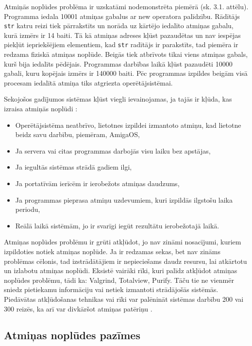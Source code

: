 Atmiņās noplūdes problēma ir uzskatāmi nodemonstrēta piemērā (sk. 3.1. attēlu).
Programma  iedala 10001 atmiņas gabalus ar new operatora palīdzību. 
Rādītājs \texttt{str} katru reizi tiek pārrakstīts un norāda uz kārtējo iedalīto atmiņas gabalu, kurā izmērs ir 14 baiti.
Tā kā atmiņas adreses kļūst pazaudētas un nav iespējas piekļūt iepriekšējiem elementiem, kad  \texttt{str} radītājs ir parakstīts, tad piemēra ir redzama fiziskā atmiņas noplūde.
Beigās tiek atbrīvots tikai viens atmiņas gabals, kurš bija iedalīts pēdējais. 
Programmas darbības laikā kļūst pazaudēti 10000 gabali, kuru kopējais izmērs ir 140000 baiti.
 Pēc programmas izpildes beigām visā procesam iedalītā atmiņa tiks atgriezta operētājsistēmai.


Sekojošos gadījumos sistēmas kļūst viegli ievainojamas, ja tajās ir kļūda, kas izraisa atmiņās noplūdi \cite{RTTV}: 
\begin{itemize}
\item { Operētājsistēma neatbrīvo, lietotnes izpildei izmantoto atmiņu, kad lietotne beidz savu darbību, piemēram, AmigaOS,}
\item { Ja servera vai citas programmas darbojās visu laiku bez apstājas, }
\item { Ja iegultās sistēmas strādā gadiem ilgi, }
\item { Ja portatīvām ierīcēm ir ierobežots atmiņas daudzums, }
\item { Ja programmas pieprasa atmiņu uzdevumiem, kuri izpildās ilgstošu laika periodu, }
\item { Reālā laikā sistēmām, jo ir svarīgi iegūt rezultātu ierobežotajā laikā. }
\end{itemize}

Atmiņas noplūdes problēmu ir grūti atkļūdot,  jo nav zināmi nosacījumi, kuriem izpildoties notiek atmiņas noplūde. 
Ja ir redzamas sekas, bet nav zināms problēmas cēlonis, tad izstrādātājiem ir nepieciešams daudz resursu, lai atkārtotu un izlabotu atmiņas noplūdi. 
Eksistē vairāki rīki, kuri palīdz atkļūdot atmiņas noplūdes problēmu, tādi ka: Valgrind, Totalview, Purify. 
Tāču tie ne vienmēr sniedz pietiekamu informāciju vai netiek izmantoti strādājošās sistēmās.
Piedāvātas atkļūdošanas tehnikas vai rīki var palēnināt sistēmas darbību 200 vai 300 reizēs, ka arī var divkāršot atmiņas patēriņu \cite{atparv}. 



\subsection{Atmiņas noplūdes pazīmes}

